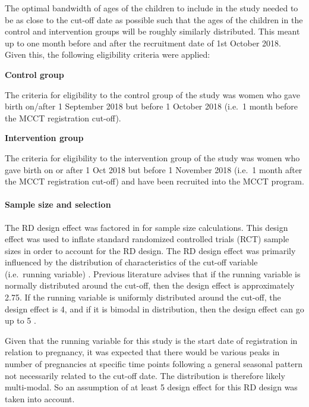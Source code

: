 \documentclass[12pt,a4paper]{article}
\let\oldparagraph\paragraph
\renewcommand{\paragraph}[1]{\oldparagraph{#1}\mbox{}}
\begin{document}
The optimal bandwidth of ages of the children to include in the study needed to be as close to the cut-off date as possible such that the ages of the children in the control and intervention groups will be roughly similarly distributed. This meant up to one month before and after the recruitment date of 1st October 2018. Given this, the following eligibility criteria were applied:

\textbf{Control group}

The criteria for eligibility to the control group of the study was women who gave birth on/after 1 September 2018 but before 1 October 2018 (i.e.~1 month before the MCCT registration cut-off).

\textbf{Intervention group}

The criteria for eligibility to the intervention group of the study was women who gave birth on or after 1 Oct 2018 but before 1 November 2018 (i.e.~1 month after the MCCT registration cut-off) and have been recruited into the MCCT program.

\hypertarget{sample-size-2}{%
\paragraph{Sample size and selection}\label{sample-size-2}}

The RD design effect was factored in for sample size calculations. This design effect was used to inflate standard randomized controlled trials (RCT) sample sizes in order to account for the RD design. The RD design effect was primarily influenced by the distribution of characteristics of the cut-off variable (i.e.~running variable) \citep{Bor2014}. Previous literature advises that if the running variable is normally distributed around the cut-off, then the design effect is approximately 2.75. If the running variable is uniformly distributed around the cut-off, the design effect is 4, and if it is bimodal in distribution, then the design effect can go up to 5 \citep{Schochet2009}.

Given that the running variable for this study is the start date of registration in relation to pregnancy, it was expected that there would be various peaks in number of pregnancies at specific time points following a general seasonal pattern not necessarily related to the cut-off date. The distribution is therefore likely multi-modal. So an assumption of at least 5 design effect for this RD design was taken into account.
\end{document}
